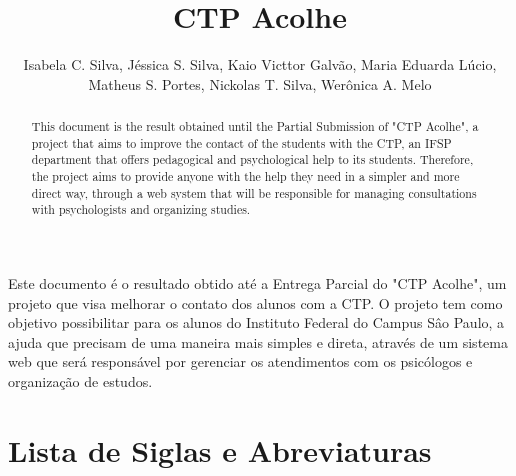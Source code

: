 \documentclass[12pt,a4paper]{article}
\title{CTP Acolhe}
\author{Isabela C. Silva, Jéssica S. Silva, Kaio Victtor Galvão, Maria Eduarda Lúcio,\\ Matheus S. Portes, Nickolas T. Silva, Werônica A. Melo}
\begin{document}
 

\maketitle

\begin{abstract}
  This document is the result obtained until the Partial Submission of "CTP Acolhe", a project that aims to improve the contact of the students with the CTP, an IFSP department that offers pedagogical and psychological help to its students. Therefore, the project aims to provide anyone with the help they need in a simpler and more direct way, through a web system that will be responsible for managing consultations with psychologists and organizing studies.
\end{abstract}
     
\begin{resumo} 
   Este documento é o resultado obtido até a Entrega Parcial do "CTP Acolhe", um projeto que visa melhorar o contato dos alunos com a CTP. O projeto tem como objetivo possibilitar para os alunos do Instituto Federal do Campus Sâo Paulo, a ajuda que precisam de uma maneira mais simples e direta, através de um sistema web que será responsável por gerenciar os atendimentos com os psicólogos e organização de estudos.
\end{resumo}

\newpage

\renewcommand{\cftloftitlefont}{\hfill\large\bfseries} %
\renewcommand{\cftafterloftitle}{\hfill}
\listoffigures
\thispagestyle{empty}

\newpage

\section*{Lista de Siglas e Abreviaturas}
\thispagestyle{empty}
\begin{acronym}[LONGEST]
\end{acronym}
\end{document}
